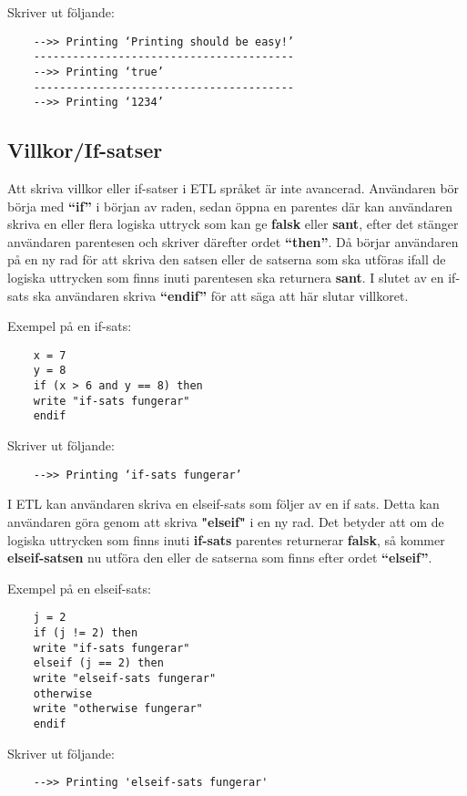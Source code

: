 \documentclass{TDP019mall}
\begin{document}
Skriver ut följande:

\begin{verbatim}
    -->> Printing ‘Printing should be easy!’
    ----------------------------------------
    -->> Printing ‘true’
    ----------------------------------------
    -->> Printing ‘1234’   
\end{verbatim} 


\subsection{Villkor/If-satser}
Att skriva villkor eller if-satser i ETL språket är inte avancerad. Användaren bör börja med \textbf{“if”} i början av raden, 
sedan öppna en parentes där kan användaren skriva en eller flera logiska uttryck som kan ge \textbf{falsk} eller \textbf{sant}, efter det stänger 
användaren parentesen och skriver därefter ordet \textbf{“then”}. Då börjar användaren på en ny rad för att skriva den satsen eller de satserna 
som ska utföras ifall de logiska uttrycken som finns inuti parentesen ska returnera \textbf{sant}. I slutet av en if-sats ska 
användaren skriva \textbf{“endif”} för att säga att här slutar villkoret.
 
Exempel på en if-sats: 
 
\begin{verbatim}
    x = 7
    y = 8
    if (x > 6 and y == 8) then
    write "if-sats fungerar"
    endif
\end{verbatim}

Skriver ut följande:
\begin{verbatim}
    -->> Printing ‘if-sats fungerar’
\end{verbatim}

I ETL kan användaren skriva en elseif-sats som följer av en if sats. Detta kan användaren göra genom att skriva \textbf{"elseif"} i 
en ny rad. Det betyder att om de logiska uttrycken som finns inuti \textbf{if-sats} parentes returnerar \textbf{falsk}, 
så kommer \textbf{elseif-satsen} nu utföra den eller de satserna som finns efter ordet \textbf{“elseif”}. 

\newpage
Exempel på en elseif-sats: 

\begin{verbatim}
    j = 2
    if (j != 2) then
    write "if-sats fungerar"
    elseif (j == 2) then
    write "elseif-sats fungerar"
    otherwise
    write "otherwise fungerar"
    endif
\end{verbatim}

Skriver ut följande:
\begin{verbatim}
    -->> Printing 'elseif-sats fungerar' 
\end{verbatim}
\end{document}
